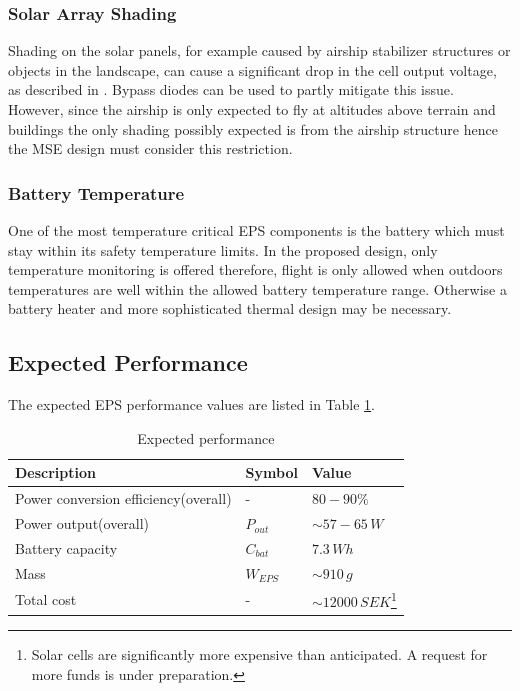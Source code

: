 \subsubsection*{Solar Array Shading}
Shading on the solar panels, for example caused by airship stabilizer structures or objects in the landscape, can cause a significant drop in the cell output voltage, as described in \cite[p. 165]{Mukund}. Bypass diodes can be used to partly mitigate this issue. However, since the airship is only expected to fly at altitudes above terrain and buildings the only shading possibly expected is from the airship structure hence the \ac{MSE} design must consider this restriction.
%
\subsubsection*{Battery Temperature}
One of the most temperature critical \ac{EPS} components is the battery which must stay within its safety temperature limits. In the proposed design, only temperature monitoring is offered therefore, flight is only allowed when outdoors temperatures are well within the allowed battery temperature range. Otherwise a battery heater and more sophisticated thermal design may be necessary.
%
\subsection{Expected Performance}
The expected \ac{EPS} performance values are listed in Table \ref{tab:expected_performance}.
%
\begin{table}[H]
\centering
\caption{Expected performance}
\label{tab:expected_performance}
\begin{minipage}{\textwidth}
\begin{tabular}{p{}p{}p{}}
\hline
\textbf{Description} & \textbf{Symbol} & \textbf{Value}\\
\hline
Power conversion efficiency(overall) & - & $80-90\%$\\
Power output(overall) & $P_{out}$ & $\sim 57-65\,W$\\
Battery capacity & $C_{bat}$ & $7.3\,Wh$\\
Mass & $W_{EPS}$ & $\sim910\,g$\\
Total cost & - & $\sim12000\,SEK$\footnote{Solar cells are significantly more expensive than anticipated. A request for more funds is under preparation.}\\
\hline
\end{tabular}\par
\vspace{-0.75\skip\footins}
\renewcommand{\footnoterule}{}
\end{minipage}
\end{table}
%
%
